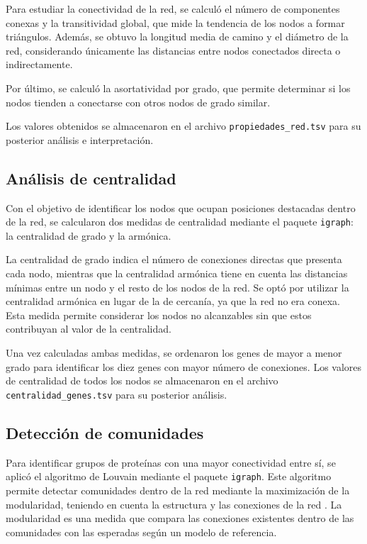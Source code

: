 Para estudiar la conectividad de la red, se calculó el número de componentes conexas y la transitividad global, que mide la tendencia de los nodos a formar triángulos. Además, se obtuvo la longitud media de camino y el diámetro de la red, considerando únicamente las distancias entre nodos conectados directa o indirectamente.

Por último, se calculó la asortatividad por grado, que permite determinar si los nodos tienden a conectarse con otros nodos de grado similar.

Los valores obtenidos se almacenaron en el archivo \texttt{propiedades\_red.tsv} para su posterior análisis e interpretación.

\subsection{Análisis de centralidad}

Con el objetivo de identificar los nodos que ocupan posiciones destacadas dentro de la red, se calcularon dos medidas de centralidad mediante el paquete \texttt{igraph}: la centralidad de grado y la armónica. 

La centralidad de grado indica el número de conexiones directas que presenta cada nodo, mientras que la centralidad armónica tiene en cuenta las distancias mínimas entre un nodo y el resto de los nodos de la red. Se optó por utilizar la centralidad armónica en lugar de la de cercanía, ya que la red no era conexa. Esta medida permite considerar los nodos no alcanzables sin que estos contribuyan al valor de la centralidad.

Una vez calculadas ambas medidas, se ordenaron los genes de mayor a menor grado para identificar los diez genes con mayor número de conexiones. Los valores de centralidad de todos los nodos se almacenaron en el archivo \texttt{centralidad\_genes.tsv} para su posterior análisis.

\subsection{Detección de comunidades}

Para identificar grupos de proteínas con una mayor conectividad entre sí, se aplicó el algoritmo de Louvain mediante el paquete \texttt{igraph}. Este algoritmo permite detectar comunidades dentro de la red mediante la maximización de la modularidad, teniendo en cuenta la estructura y las conexiones de la red \cite{Singlan2025}. La modularidad es una medida que compara las conexiones existentes dentro de las comunidades con las esperadas según un modelo de referencia.

